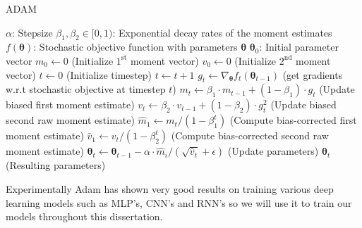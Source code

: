\begin{algorithm}
  \caption{ADAM}\label{ADAM}
  \begin{algorithmic}[1]
    \Require $\alpha$: Stepsize
    \Require $\beta_1, \beta_2 \in [0, 1)$: Exponential decay rates of the moment estimates
    \Require $f(\bm{\theta})$: Stochastic objective function with parameters
    $\bm{\theta}$
    \Require $\bm{\theta}_0$: Initial parameter vector
    \State $m_0 \gets 0$ (Initialize $1^{\text{st}}$ moment vector)
    \State $v_0 \gets 0$ (Initialize $2^{\text{nd}}$ moment vector)
    \State $t \gets 0$ (Initialize timestep)
    \State $t \gets t + 1$
    \State $g_t \gets \nabla_{\bm{\theta}}f_t(\bm{\theta}_{t-1})$ (get gradients w.r.t stochastic objective at timestep $t$)
    \State $m_t \gets \beta_1 \cdot m_{t-1} + (1 - \beta_1) \cdot g_t$ (Update biased first moment estimate)
    \State $v_t \gets \beta_2 \cdot v_{t-1} + (1 - \beta_2) \cdot g^2_t$ (Update biased second raw moment estimate)
    \State $\hat{m}_1 \gets m_t / (1 - \beta^t_1)$ (Compute bias-corrected first moment estimate)
    \State $\hat{v}_1 \gets v_t / (1 - \beta^t_2)$ (Compute bias-corrected second raw moment estimate)
    \State $\bm{\theta}_t \gets \bm{\theta}_{t-1} - \alpha \cdot \hat{m}_i/(\sqrt{\hat{v}_t} + \epsilon)$ (Update parameters)
    \EndWhile
    \Return $\bm{\theta}_t$ (Resulting parameters)
  \end{algorithmic}
\end{algorithm}

Experimentally Adam has shown very good results on training various deep
learning models such as MLP's, CNN's and RNN's so we will use it to train our
models throughout this dissertation\cite{kingma_adam:_2014}.